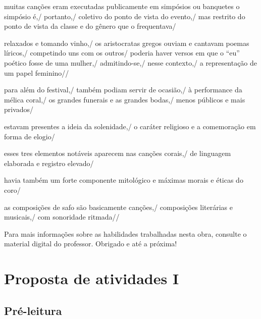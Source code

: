 \documentclass[12pt]{extarticle}
\begin{document}
muitas canções eram executadas publicamente em simpósios ou banquetes
o simpósio é,/ portanto,/ coletivo do ponto de vista do evento,/ mas restrito do ponto de vista da classe e do gênero que o frequentava/

relaxados e tomando vinho,/ os aristocratas gregos ouviam e cantavam poemas líricos,/ competindo uns com os outros/ poderia haver versos em que o “eu” poético fosse de uma mulher,/ admitindo-se,/ nesse contexto,/ a representação de um papel feminino// 

para além do festival,/ também podiam servir de ocasião,/ à performance da mélica coral,/ os grandes funerais e as grandes bodas,/ menos públicos e mais privados/

estavam presentes a ideia da solenidade,/ o caráter religioso e a comemoração em forma de elogio/

esses tres elementos notáveis aparecem nas canções corais,/ de linguagem elaborada e registro elevado/

havia também um forte componente mitológico e máximas morais e éticas do coro/

as composições de safo são basicamente canções,/ composições literárias e musicais,/ com sonoridade ritmada//

Para mais informações sobre as habilidades trabalhadas nesta obra, consulte o material digital do professor. Obrigado e até a próxima!


\section{Proposta de atividades I}

\subsection{Pré-leitura}




\end{document}

